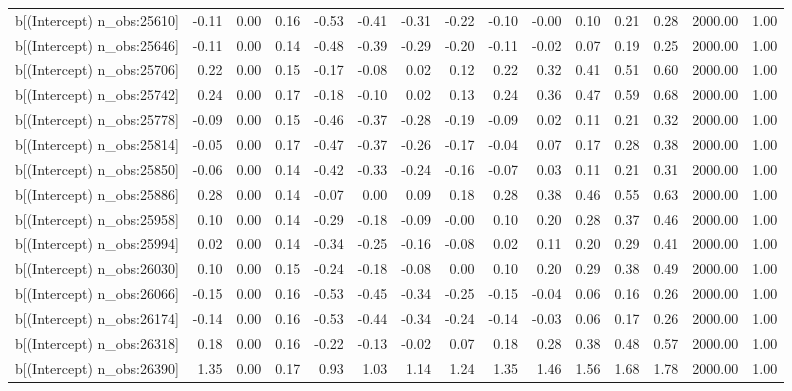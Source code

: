 \begin{table}[ht]
\begin{tabular}{rrrrrrrrrrrrrrr}
  b[(Intercept) n\_obs:25610] & -0.11 & 0.00 & 0.16 & -0.53 & -0.41 & -0.31 & -0.22 & -0.10 & -0.00 & 0.10 & 0.21 & 0.28 & 2000.00 & 1.00 \\ 
  b[(Intercept) n\_obs:25646] & -0.11 & 0.00 & 0.14 & -0.48 & -0.39 & -0.29 & -0.20 & -0.11 & -0.02 & 0.07 & 0.19 & 0.25 & 2000.00 & 1.00 \\ 
  b[(Intercept) n\_obs:25706] & 0.22 & 0.00 & 0.15 & -0.17 & -0.08 & 0.02 & 0.12 & 0.22 & 0.32 & 0.41 & 0.51 & 0.60 & 2000.00 & 1.00 \\ 
  b[(Intercept) n\_obs:25742] & 0.24 & 0.00 & 0.17 & -0.18 & -0.10 & 0.02 & 0.13 & 0.24 & 0.36 & 0.47 & 0.59 & 0.68 & 2000.00 & 1.00 \\ 
  b[(Intercept) n\_obs:25778] & -0.09 & 0.00 & 0.15 & -0.46 & -0.37 & -0.28 & -0.19 & -0.09 & 0.02 & 0.11 & 0.21 & 0.32 & 2000.00 & 1.00 \\ 
  b[(Intercept) n\_obs:25814] & -0.05 & 0.00 & 0.17 & -0.47 & -0.37 & -0.26 & -0.17 & -0.04 & 0.07 & 0.17 & 0.28 & 0.38 & 2000.00 & 1.00 \\ 
  b[(Intercept) n\_obs:25850] & -0.06 & 0.00 & 0.14 & -0.42 & -0.33 & -0.24 & -0.16 & -0.07 & 0.03 & 0.11 & 0.21 & 0.31 & 2000.00 & 1.00 \\ 
  b[(Intercept) n\_obs:25886] & 0.28 & 0.00 & 0.14 & -0.07 & 0.00 & 0.09 & 0.18 & 0.28 & 0.38 & 0.46 & 0.55 & 0.63 & 2000.00 & 1.00 \\ 
  b[(Intercept) n\_obs:25958] & 0.10 & 0.00 & 0.14 & -0.29 & -0.18 & -0.09 & -0.00 & 0.10 & 0.20 & 0.28 & 0.37 & 0.46 & 2000.00 & 1.00 \\ 
  b[(Intercept) n\_obs:25994] & 0.02 & 0.00 & 0.14 & -0.34 & -0.25 & -0.16 & -0.08 & 0.02 & 0.11 & 0.20 & 0.29 & 0.41 & 2000.00 & 1.00 \\ 
  b[(Intercept) n\_obs:26030] & 0.10 & 0.00 & 0.15 & -0.24 & -0.18 & -0.08 & 0.00 & 0.10 & 0.20 & 0.29 & 0.38 & 0.49 & 2000.00 & 1.00 \\ 
  b[(Intercept) n\_obs:26066] & -0.15 & 0.00 & 0.16 & -0.53 & -0.45 & -0.34 & -0.25 & -0.15 & -0.04 & 0.06 & 0.16 & 0.26 & 2000.00 & 1.00 \\ 
  b[(Intercept) n\_obs:26174] & -0.14 & 0.00 & 0.16 & -0.53 & -0.44 & -0.34 & -0.24 & -0.14 & -0.03 & 0.06 & 0.17 & 0.26 & 2000.00 & 1.00 \\ 
  b[(Intercept) n\_obs:26318] & 0.18 & 0.00 & 0.16 & -0.22 & -0.13 & -0.02 & 0.07 & 0.18 & 0.28 & 0.38 & 0.48 & 0.57 & 2000.00 & 1.00 \\ 
  b[(Intercept) n\_obs:26390] & 1.35 & 0.00 & 0.17 & 0.93 & 1.03 & 1.14 & 1.24 & 1.35 & 1.46 & 1.56 & 1.68 & 1.78 & 2000.00 & 1.00 \\ 

\end{tabular}
\end{table}
